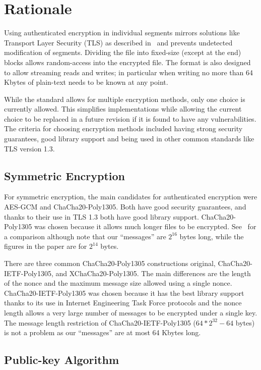 \documentclass[10pt]{article}
\begin{document}
\appendix
\section{Rationale}

Using authenticated encryption in individual segments mirrors solutions like Transport Layer
Security (TLS) as described in~\cite{RFC8446} and prevents undetected modification of segments.
Dividing the file into fixed-size (except at the end) blocks allows random-access into the encrypted file.
The format is also designed to allow streaming reads and writes;
in particular when writing no more than 64 Kbytes of plain-text needs to be known at any point.

While the standard allows for multiple encryption methods, only one choice is currently allowed.
This simplifies implementations while allowing the current choice to be replaced in a future revision if it is found
to have any vulnerabilities.
The criteria for choosing encryption methods included having strong security guarantees, good library support
and being used in other common standards like TLS version 1.3.

\subsection{Symmetric Encryption}

For symmetric encryption, the main candidates for authenticated encryption were AES-GCM and ChaCha20-Poly1305.
Both have good security guarantees, and thanks to their use in TLS 1.3 both have good library support.
ChaCha20-Poly1305 was chosen because it allows much longer files to be encrypted.
See~\cite{AE LIMITS} for a comparison although note that our ``messages'' are $2^{16}$ bytes long,
while the figures in the paper are for $2^{14}$ bytes.

There are three common ChaCha20-Poly1305 constructions original, ChaCha20-IETF-Poly1305, and XChaCha20-Poly1305.
The main differences are the length of the nonce and the maximum message size allowed using a single nonce.
ChaCha20-IETF-Poly1305 was chosen because it has the best library support thanks to its use in Internet Engineering
Task Force protocols and the nonce length allows a very large number of messages to be encrypted under a single key.
The message length restriction of ChaCha20-IETF-Poly1305 ($64*2^{32}-64$ bytes) is not a problem as our ``messages''
are at most 64 Kbytes long.

\subsection{Public-key Algorithm}
\end{document}
